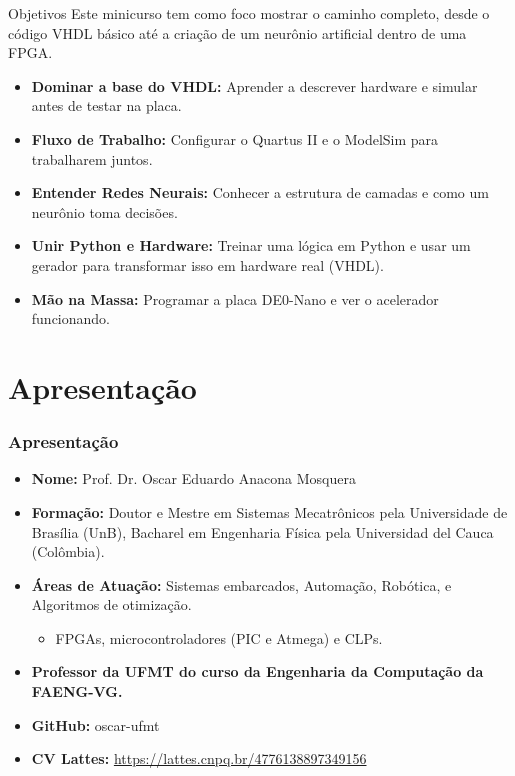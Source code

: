 \documentclass[aspectratio=169]{beamer}
\begin{document}
\begin{frame}{Objetivos}
	Este minicurso tem como foco mostrar o caminho completo, desde o código VHDL básico até a criação de um neurônio artificial dentro de uma FPGA.
	
	\begin{itemize}
		\item \textbf{Dominar a base do VHDL:} Aprender a descrever hardware e simular antes de testar na placa.
		\item \textbf{Fluxo de Trabalho:} Configurar o Quartus II e o ModelSim para trabalharem juntos.
		\item \textbf{Entender Redes Neurais:} Conhecer a estrutura de camadas e como um neurônio toma decisões.
		\item \textbf{Unir Python e Hardware:} Treinar uma lógica em Python e usar um gerador para transformar isso em hardware real (VHDL).
		\item \textbf{Mão na Massa:} Programar a placa DE0-Nano e ver o acelerador funcionando.
	\end{itemize}
\end{frame}










\section{Apresentação}
\begin{frame}
	
	\frametitle{Apresentação}
	\begin{itemize}
		\justifying
		\item \textbf{Nome:} Prof. Dr. Oscar Eduardo Anacona Mosquera
		\item \textbf{Formação:} Doutor e Mestre em Sistemas Mecatrônicos pela Universidade de Brasília (UnB), Bacharel em Engenharia Física pela Universidad del Cauca (Colômbia).
		\item \textbf{Áreas de Atuação:} Sistemas embarcados, Automação, Robótica, e Algoritmos de otimização.
		\begin{itemize}
			\item FPGAs, microcontroladores (PIC e Atmega) e CLPs.
		\end{itemize}
		
		\item \textbf{Professor da UFMT do curso da Engenharia da Computação da FAENG-VG.}

		\item \textbf{GitHub:} oscar-ufmt
		\item \textbf{CV Lattes:} \url{https://lattes.cnpq.br/4776138897349156}
	\end{itemize}
\end{frame}
\end{document}
